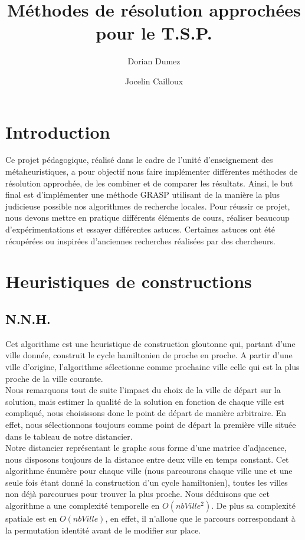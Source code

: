 \documentclass[12pt,a4paper]{article}
\title{Méthodes de résolution approchées pour le T.S.P.}
\author{Dorian Dumez \and Jocelin Cailloux}
\begin{document}
\maketitle
\tableofcontents

\section{Introduction}
Ce projet pédagogique, réalisé dans le cadre de l'unité d'enseignement des métaheuristiques, a pour objectif nous faire implémenter différentes méthodes de résolution approchée, de les combiner et de comparer les résultats. Ainsi, le but final est d'implémenter une méthode GRASP utilisant de la manière la plus judicieuse possible nos algorithmes de recherche locales. Pour réussir ce projet, nous devons mettre en pratique différents éléments de cours, réaliser beaucoup d'expérimentations et essayer différentes astuces. Certaines astuces ont été récupérées ou inspirées d'anciennes recherches réalisées par des chercheurs.

\section{Heuristiques de constructions}
\subsection{N.N.H.}
Cet algorithme est une heuristique de construction gloutonne qui, partant d'une ville donnée, construit le cycle hamiltonien de proche en proche. A partir d'une ville d'origine, l'algorithme sélectionne comme prochaine ville celle qui est la plus proche de la ville courante.\\

Nous remarquons tout de suite l'impact du choix de la ville de départ sur la solution, mais estimer la qualité de la solution en fonction de chaque ville est compliqué, nous choisissons donc le point de départ de manière arbitraire. En effet, nous sélectionnons toujours comme point de départ la première ville située dans le tableau de notre distancier.\\

Notre distancier représentant le graphe sous forme d'une matrice d'adjacence, nous disposons toujours de la distance entre deux ville en temps constant. Cet algorithme énumère pour chaque ville (nous parcourons chaque ville une et une seule fois étant donné la construction d'un cycle hamiltonien), toutes les villes non déjà parcourues pour trouver la plus proche. Nous déduisons que cet algorithme a une complexité temporelle en $O(nbVille^2)$. De plus sa complexité spatiale est en $O(nbVille)$, en effet, il n’alloue que le parcours correspondant à la permutation identité avant de le modifier sur place.\\
\end{document}
